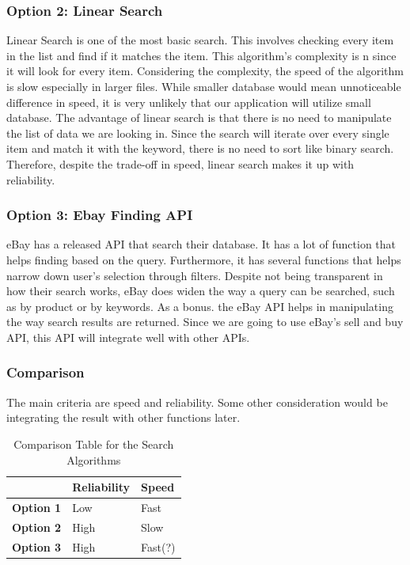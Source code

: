 \documentclass[journal,compsoc, 10pt, draftclsnofoot, onecolumn]{IEEEtran}
\begin{document}
\subsubsection*{Option 2: Linear Search}
Linear Search is one of the most basic search. This involves checking every item in
the list and find if it matches the item. This algorithm's complexity is n since it
will look for every item. Considering the complexity, the speed of the algorithm is
slow especially in larger files. While smaller database would mean unnoticeable
difference in speed, it is very unlikely that our application will utilize small
database. The advantage of linear search is that there is no need to manipulate the
list of data we are looking in. Since the search will iterate over every single item
and match it with the keyword, there is no need to sort like binary search.
Therefore, despite the trade-off in speed, linear search makes it up with
reliability.

\subsubsection*{Option 3: Ebay Finding API}
eBay has a released API that search their database. It has a lot of function that
helps finding based on the query. Furthermore, it has several functions that helps
narrow down user's selection through filters. Despite not being transparent in how
their search works, eBay does widen the way a query can be searched, such as by
product or by keywords. As a bonus. the eBay API helps in manipulating the way search
results are returned. Since we are going to use eBay's sell and buy API, this API
will integrate well with other APIs.

\subsubsection*{Comparison}
The main criteria are speed and reliability. Some other consideration would be
integrating the result with other functions later.

\begin{table}[h]
	\centering
	\caption{Comparison Table for the Search Algorithms}
	\label{Comparison Table for the Search Algorithm}
	\begin{tabularx}{\textwidth}{|X|X|X|}
		\hline
		\textbf{}         & \textbf{Reliability}                & \textbf{Speed} 
		\\ \hline
		\textbf{Option 1} & Low & Fast
		\\ \hline
\textbf{Option 2} & High & Slow		\\ \hline
\textbf{Option 3} & High &Fast(?)		\\ \hline
	\end{tabularx}
\end{table}
\end{document}
